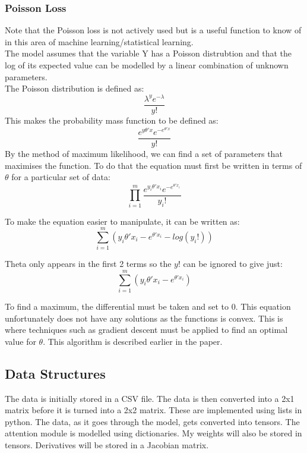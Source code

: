 \documentclass{article}
\begin{document}
\clearpage


\subsubsection{Poisson Loss}
Note that the Poisson loss is not actively used but is a useful function to know
of in this area of machine learning/statistical learning. \\
The model assumes that the variable Y has a Poisson distrubtion and that the log
of its expected value can be modelled by a linear combination of unknown
parameters.\\
The Poisson distribution is defined as: $$\frac{\lambda^y e^{-\lambda}}{y!}$$
This makes the probability mass function to be defined as:
$$\frac{e^{y\theta'x}e^{-e^{\theta'x}}}{y!}$$
By the method of maximum likelihood, we can find a set of parameters that maximises
the function. To do that the equation must first be written in terms of $\theta$ for a particular set of data:
$$\prod _{i=1}^{m}\frac{e^{y_i\theta'x_i}e^{-e^{\theta'x_i}}}{y_i!}$$

To make the equation easier to manipulate, it can be written as:
$$\sum_{i=1}^m (y_i\theta'x_i - e^{\theta'x_i} - log(y_i!))$$

Theta only appears in the first 2 terms so the $y!$ can be ignored to give just:
$$\sum_{i=1}^m (y_i\theta'x_i - e^{\theta'x_i})$$

To find a maximum, the differential must be taken and set to 0. This equation
unfortunately does not have any solutions as the functions is convex. This is where
techniques such as gradient descent must be applied to find an optimal value for
$\theta$. This algorithm is described earlier in the paper.

\clearpage
\subsection{Data Structures}
The data is initially stored in a CSV file. The data is then converted into a 2x1 matrix before it is turned into a 2x2 matrix. These are implemented using lists in python. The data, as it goes through the model, gets converted into tensors.
The attention module is modelled using dictionaries.
My weights will also be stored in tensors.
Derivatives will be stored in a Jacobian matrix.
\clearpage
\end{document}
